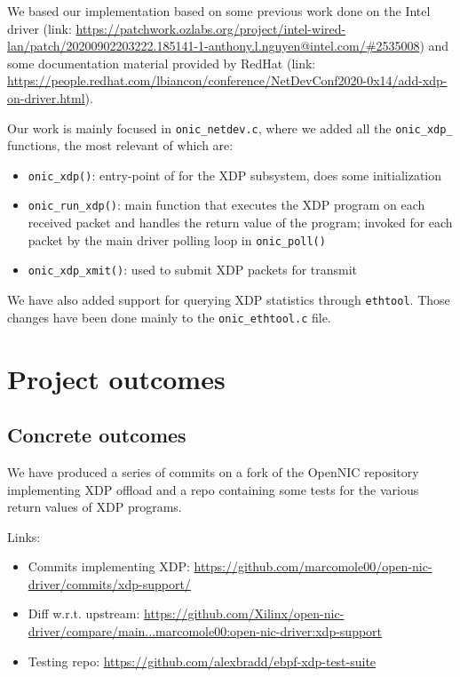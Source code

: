 \documentclass[10pt,a4]{article}
\begin{document}

We based our implementation based on some previous work done on the Intel
driver (link: \url{https://patchwork.ozlabs.org/project/intel-wired-lan/patch/20200902203222.185141-1-anthony.l.nguyen@intel.com/#2535008})
and some documentation material provided by RedHat (link: \url{https://people.redhat.com/lbiancon/conference/NetDevConf2020-0x14/add-xdp-on-driver.html}).

Our work is mainly focused in \texttt{onic\_netdev.c}, where we added all the
\texttt{onic\_xdp\_\*} functions, the most relevant of which are:

\begin{itemize}
  \item \texttt{onic\_xdp()}: entry-point of for the XDP subsystem, does some
    initialization
  \item \texttt{onic\_run\_xdp()}: main function that executes the XDP program
    on each received packet and handles the return value of the program; invoked
    for each packet by the main driver polling loop in \texttt{onic\_poll()}
  \item \texttt{onic\_xdp\_xmit()}: used to submit XDP packets for transmit
\end{itemize}

We have also added support for querying XDP statistics through \texttt{ethtool}.
Those changes have been done mainly to the \texttt{onic\_ethtool.c} file.


\section{Project outcomes}

\subsection{Concrete outcomes}
%

We have produced a series of commits on a fork of the OpenNIC repository
implementing XDP offload and a repo containing some tests for the various return
values of XDP programs.

Links:

\begin{itemize}
  \item Commits implementing XDP: \url{https://github.com/marcomole00/open-nic-driver/commits/xdp-support/}
  \item Diff w.r.t. upstream: \url{https://github.com/Xilinx/open-nic-driver/compare/main...marcomole00:open-nic-driver:xdp-support}
  \item Testing repo: \url{https://github.com/alexbradd/ebpf-xdp-test-suite}
\end{itemize}
\end{document}
